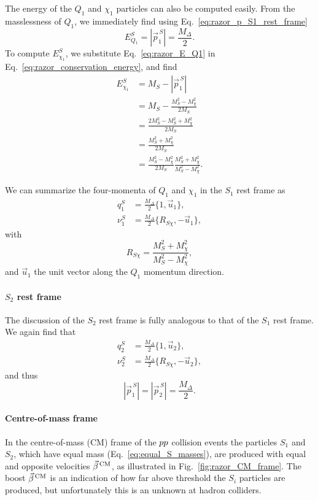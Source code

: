 The energy of the $Q_1$ and $\chi_1$ particles can also be computed easily. 
From the masslessness of $Q_1$, we immediately find using Eq.~\ref{eq:razor_p_S1_rest_frame}
\begin{equation}
  E^S_{Q_1} = |\vec{p}^{\,S}_1| = \frac{M_\Delta}{2}. \label{eq:razor_E_Q1}
\end{equation}
To compute $E^S_{\chi_1}$, we substitute Eq.~\ref{eq:razor_E_Q1} in 
Eq.~\ref{eq:razor_conservation_energy}, and find 
\begin{align}
  E^S_{\chi_1} &= M_S - |\vec{p}^{\,S}_1|\\
	       &= M_S - \frac{M_S^2 -M_{\chi}^2}{2 M_S} \\
	       &= \frac{2M_S^2 - M_S^2 + M_{\chi}^2}{2 M_S} \\
	       &= \frac{M_S^2 + M_{\chi}^2}{2 M_S} \\
	       &= \frac{M_S^2 - M_{\chi}^2}{2 M_S} \frac{M_S^2 + M_{\chi}^2}{M_S^2 - M_{\chi}^2} .
\end{align}

We can summarize the four-momenta of $Q_1$ and $\chi_1$ in the $S_1$ rest frame as
\begin{align}
  q_1^S   &= \frac{M_\Delta}{2} \{ 1, \vec{u}_1\} , \\  
  \nu_1^S &= \frac{M_\Delta}{2} \{ R_{S\chi}, -\vec{u}_1\} ,
\end{align}
with $$R_{S\chi} = \frac{M_S^2 + M_{\chi}^2}{M_S^2 - M_{\chi}^2},$$ and $\vec{u}_1$ the unit
vector along the $Q_1$ momentum direction.



\paragraph{$S_2$ rest frame}
The discussion of the $S_2$ rest frame is fully analogous to that of the $S_1$ rest frame. We
again find that
\begin{align}
  q_2^S   &= \frac{M_\Delta}{2} \{ 1, \vec{u}_2\} , \\  
  \nu_2^S &= \frac{M_\Delta}{2} \{ R_{S\chi}, -\vec{u}_2\} ,
\end{align}
and thus
\begin{equation}
  |\vec{p}^{\,S}_1| = |\vec{p}^{\,S}_2| = \frac{M_\Delta}{2} . \label{eq:razor_equal_momenta}
\end{equation}


\paragraph{Centre-of-mass frame}
In the centre-of-mass (CM) frame of the ${p}{p}$ collision events the particles $S_1$
and $S_2$, which have equal mass (Eq.~\ref{eq:equal_S_masses}), are produced with equal and opposite
velocities $\vec{\beta}^{\,\textrm{CM}}$, as illustrated in Fig.~\ref{fig:razor_CM_frame}. The boost $\vec{\beta}^{\,\textrm{CM}}$ is an
indication of how far above threshold the $S_i$ particles are produced, but unfortunately this is
an unknown at hadron colliders. 


